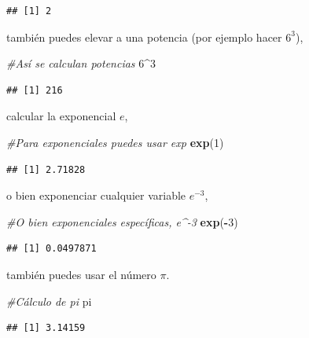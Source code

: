 \documentclass[
]{book}
\newenvironment{Shaded}{\begin{snugshade}}{\end{snugshade}}
\newcommand{\CommentTok}[1]{\textcolor[rgb]{0.56,0.35,0.01}{\textit{#1}}}
\newcommand{\DecValTok}[1]{\textcolor[rgb]{0.00,0.00,0.81}{#1}}
\newcommand{\KeywordTok}[1]{\textcolor[rgb]{0.13,0.29,0.53}{\textbf{#1}}}
\newcommand{\NormalTok}[1]{#1}
\newcommand{\OperatorTok}[1]{\textcolor[rgb]{0.81,0.36,0.00}{\textbf{#1}}}
\begin{document}
\begin{verbatim}
## [1] 2
\end{verbatim}

también puedes elevar a una potencia (por ejemplo hacer \(6^3\)),

\begin{Shaded}
\begin{Highlighting}[]
\CommentTok{#Así se calculan potencias}
\DecValTok{6}\OperatorTok{^}\DecValTok{3}
\end{Highlighting}
\end{Shaded}

\begin{verbatim}
## [1] 216
\end{verbatim}

calcular la exponencial \(e\),

\begin{Shaded}
\begin{Highlighting}[]
\CommentTok{#Para exponenciales puedes usar exp}
\KeywordTok{exp}\NormalTok{(}\DecValTok{1}\NormalTok{)}
\end{Highlighting}
\end{Shaded}

\begin{verbatim}
## [1] 2.71828
\end{verbatim}

o bien exponenciar cualquier variable \(e^{-3}\),

\begin{Shaded}
\begin{Highlighting}[]
\CommentTok{#O bien exponenciales específicas, e^-3}
\KeywordTok{exp}\NormalTok{(}\OperatorTok{-}\DecValTok{3}\NormalTok{)}
\end{Highlighting}
\end{Shaded}

\begin{verbatim}
## [1] 0.0497871
\end{verbatim}

también puedes usar el número \(\pi\).

\begin{Shaded}
\begin{Highlighting}[]
\CommentTok{#Cálculo de pi}
\NormalTok{pi}
\end{Highlighting}
\end{Shaded}

\begin{verbatim}
## [1] 3.14159
\end{verbatim}
\end{document}
